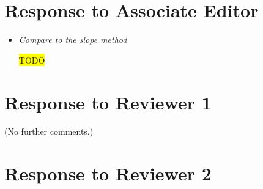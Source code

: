 \documentclass[11pt]{article}
\newcommand{\hilight}[1]{\colorbox{yellow}{#1}}
\newcommand{\todo}{\hilight{TODO}}
\begin{document}
\section*{Response to Associate Editor}

\begin{itemize}

\item \textit{Compare to the slope method}

\todo

\end{itemize}


\section*{Response to Reviewer 1}

(No further comments.)


\section*{Response to Reviewer 2}
\end{document}
